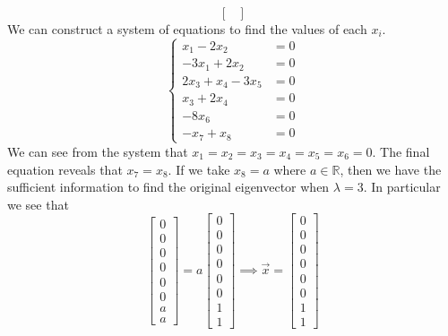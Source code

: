 \documentclass{report}
\begin{document}
\begin{itemize}
$$\begin{bmatrix}
\end{bmatrix}
$$
We can construct a system of equations to find the values of each $x_i$.
$$
\left\{
\begin{aligned}
x_1 - 2x_2 & = 0 \\
-3x_1 + 2x_2 & = 0 \\
2x_3 + x_4-3x_5 & = 0 \\
x_3 + 2x_4 & = 0 \\
-8x_6 & = 0 \\
-x_7 + x_8 & = 0
\end{aligned}
\right.
$$
We can see from the system that $x_1 = x_2 = x_3 = x_4 = x_5 = x_6 = 0$.  The final equation reveals that $x_7 = x_8$.  If we take $x_8=a$ where $a\in\mathbb{R}$,  then we have the sufficient information to find the original eigenvector when $\lambda = 3$.  In particular we see that
$$
\begin{bmatrix}
0 \\ 0 \\ 0 \\ 0 \\ 0 \\ 0 \\ a \\ a
\end{bmatrix} =
a\begin{bmatrix}
0 \\ 0 \\ 0 \\ 0 \\ 0 \\ 0 \\ 1 \\ 1
\end{bmatrix} \implies
\vec{x} = \begin{bmatrix}
0 \\ 0 \\ 0 \\ 0 \\ 0 \\ 0 \\ 1 \\ 1
\end{bmatrix}
$$ 
\end{itemize}
\end{document}
